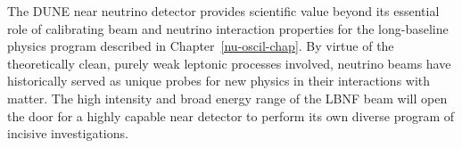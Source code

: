
The DUNE near neutrino detector provides scientific value beyond
      its essential role of calibrating beam and neutrino interaction
      properties for the long-baseline physics program described in
      Chapter~\ref{nu-oscil-chap}.
      By virtue of the theoretically clean, purely weak leptonic
      processes involved,
      neutrino beams have historically served as unique probes for
      new physics in their interactions with matter.
      The high intensity and broad energy range of the LBNF beam
      will open the door for a highly capable near detector
      to perform its own diverse
program of incisive investigations.

